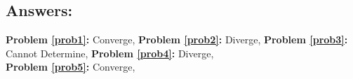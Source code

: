 \documentclass[10pt]{article}
\begin{document}
\vfill

\subsection*{Answers:}
\textbf{Problem \ref{prob1}:} Converge, 
\textbf{Problem \ref{prob2}:} Diverge, 
\textbf{Problem \ref{prob3}:} Cannot Determine, 
\textbf{Problem \ref{prob4}:} Diverge,\\
\textbf{Problem \ref{prob5}:} Converge,
\end{document}
